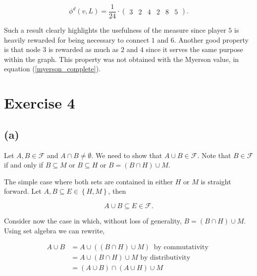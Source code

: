 \documentclass[american]{scrartcl}
\newcommand{\set}[1]{\left\{#1\right\}}
\begin{document}
\begin{equation}
    \phi^d(v, L) =
    \frac{1}{24} \cdot \begin{pmatrix}
        3 &
        2 &
        4 &
        2 &
        8 &
        5
    \end{pmatrix}.
\end{equation}

Such a result clearly highlights the usefulness of the measure since player $5$ is heavily rewarded for being necessary to connect $1$ and $6$. Another good property is that node $3$ is rewarded as much as $2$ and $4$ since it serves the same purpose within the graph. This property was not obtained with the Myerson value, in equation (\ref{myerson_complete}).

\section*{Exercise 4}

\subsection*{(a)}

Let $A, B \in \mathcal{F}$ and $A \cap B \neq \emptyset$. We need to show that $A \cup B \in \mathcal{F}$. Note that $B \in \mathcal{F}$ if and only if $B \subseteq M$ or $B \subseteq H$ or $B = (B \cap H) \cup M$.

The simple case where both sets are contained in either $H$ or $M$ is straight forward. Let $A, B \subseteq E \in \set{H, M}$, then

\begin{equation}
    A \cup B \subseteq E \in \mathcal{F}.
\end{equation}


Consider now the case in which, without loss of generality, $B = (B \cap H) \cup M$. Using set algebra we can rewrite,

\begin{equation} \label{gen_set}
    \begin{split}
        A \cup B &= A \cup ((B \cap H) \cup M) \ \text{ by commutativity } \\
        &= A \cup (B \cap H) \cup M \text{ by distributivity } \\
        &= (A \cup B) \cap (A \cup H) \cup M
    \end{split}
\end{equation}
\end{document}
